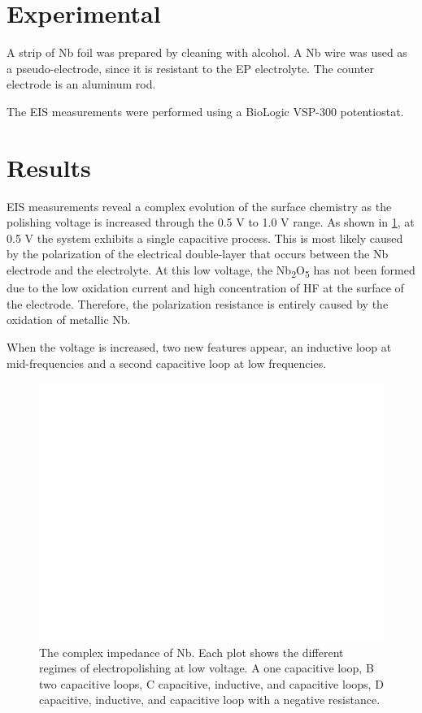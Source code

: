 \documentclass[11pt]{article}
\begin{document}
\section{Experimental}
\label{sec:orgb71f960}



A strip of Nb foil was prepared by cleaning with alcohol. A Nb wire was used as a pseudo-electrode, since it is resistant to the EP electrolyte. The counter electrode is an aluminum rod.

The EIS measurements were performed using a BioLogic VSP-300 potentiostat.










\section{Results}
\label{sec:org4a45003}

EIS measurements reveal a complex evolution of the surface chemistry as the polishing voltage is increased through the 0.5 V to 1.0 V range. As shown in \ref{fig:nyquistplot}, at 0.5 V the system exhibits a single capacitive process. This is most likely caused by the polarization of the electrical double-layer that occurs between the Nb electrode and the electrolyte. At this low voltage, the Nb\textsubscript{2}O\textsubscript{5} has not been formed due to the low oxidation current and high concentration of HF at the surface of the electrode. Therefore, the polarization resistance is entirely caused by the oxidation of metallic Nb.

When the voltage is increased, two new features appear, an inductive loop at mid-frequencies and a second capacitive loop at low frequencies.

\begin{figure}
  \label{fig:nyquistplot}
  \includegraphics[]{figures/nyquist.png}
  \caption{The complex impedance of Nb. Each plot shows the different regimes of electropolishing at low voltage. A one capacitive loop, B two capacitive loops, C capacitive, inductive, and capacitive loops, D capacitive, inductive, and capacitive loop with a negative resistance.}
\end{figure}
\end{document}
